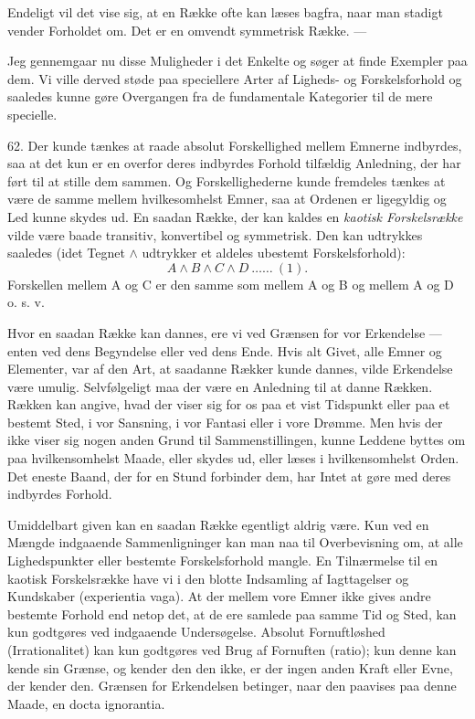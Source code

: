 \documentclass[12pt,a4paper]{book}
\newcommand{\opage}[1]{\marginnote{\footnotesize\textit{[#1]}}}
\begin{document}
Endeligt vil det vise sig, at en Række ofte kan læses bagfra, naar man stadigt
vender Forholdet om. Det er en omvendt symmetrisk Række. ---

Jeg gennemgaar nu disse Muligheder i det Enkelte og søger at finde Exempler
paa dem. Vi ville derved støde paa speciellere Arter af Ligheds- og
Forskelsforhold og saaledes kunne gøre Overgangen fra de fundamentale
Kategorier til de mere specielle.

62. Der kunde tænkes at raade absolut Forskellighed mellem Emnerne indbyrdes,
saa at det kun er en overfor deres indbyrdes Forhold tilfældig Anledning, der
har ført til at stille dem sammen. Og Forskellighederne kunde fremdeles tænkes
at være de samme mellem hvilkesomhelst Emner, saa at Ordenen er ligegyldig og
Led kunne skydes ud. En saadan Række, der kan kaldes en \emph{kaotisk
Forskelsrække} vilde være baade transitiv, konvertibel og symmetrisk. Den kan
udtrykkes saaledes (idet Tegnet $\wedge$ udtrykker et aldeles ubestemt
Forskelsforhold):
\[ A \wedge B \wedge C \wedge D \ \ldots\ldots\ (1). \]
Forskellen mellem A og C er den samme som mellem A og B og mellem A og D
o. s. v.

Hvor en saadan Række kan dannes, ere vi ved Grænsen \opage{165} for vor Erkendelse ---
enten ved dens Begyndelse eller ved dens Ende. Hvis alt Givet, alle Emner og
Elementer, var af den Art, at saadanne Rækker kunde dannes, vilde Erkendelse
være umulig. Selvfølgeligt maa der være en Anledning til at danne Rækken.
Rækken kan angive, hvad der viser sig for os paa et vist Tidspunkt eller paa et
bestemt Sted, i vor Sansning, i vor Fantasi eller i vore Drømme. Men hvis der
ikke viser sig nogen anden Grund til Sammenstillingen, kunne Leddene byttes om
paa hvilkensomhelst Maade, eller skydes ud, eller læses i hvilkensomhelst
Orden. Det eneste Baand, der for en Stund forbinder dem, har Intet at gøre med
deres indbyrdes Forhold.

Umiddelbart given kan en saadan Række egentligt aldrig være. Kun ved en Mængde
indgaaende Sammenligninger kan man naa til Overbevisning om, at alle
Lighedspunkter eller bestemte Forskelsforhold mangle. En Tilnærmelse til en
kaotisk Forskelsrække have vi i den blotte Indsamling af Iagttagelser og
Kundskaber (experientia vaga). At der mellem vore Emner ikke gives andre
bestemte Forhold end netop det, at de ere samlede paa samme Tid og Sted, kan
kun godtgøres ved indgaaende Undersøgelse. Absolut Fornuftløshed
(Irrationalitet) kan kun godtgøres ved Brug af Fornuften (ratio); kun denne kan
kende sin Grænse, og kender den den ikke, er der ingen anden Kraft eller Evne,
der kender den. Grænsen for Erkendelsen betinger, naar den paavises paa denne
Maade, en docta ignorantia.
\end{document}

